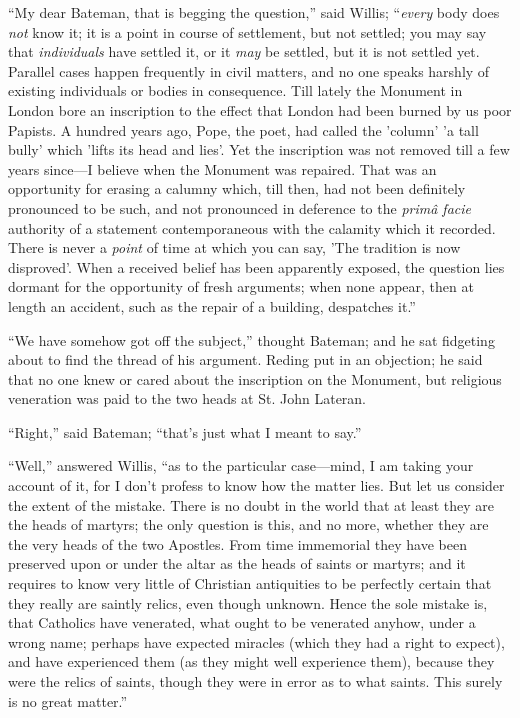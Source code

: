 ``My dear Bateman, that is begging the question,'' said
Willis; ``\emph{every} body does \emph{not} know it; it is a point
in course of settlement, but not settled; you may say that \emph{individuals}
have settled it, or it \emph{may} be settled, but it is not settled
yet. Parallel cases happen frequently in civil matters, and no one
speaks harshly of existing individuals or bodies in consequence.
Till lately the Monument in London bore an inscription to the effect
that London had been burned by us poor Papists. A hundred years ago,
Pope, the poet, had called the 'column' 'a tall bully' which 'lifts
its head and lies'. Yet the inscription was not removed till a few
years since—I believe when the Monument was repaired. That was an
opportunity for erasing a calumny which, till then, had not been
definitely pronounced to be such, and not pronounced in deference to
the \emph{primâ facie} authority of a statement contemporaneous with
the calamity which it recorded. There is never a \emph{point} of time
at which you can say, 'The tradition is now disproved'. When a
received belief has been apparently exposed, the question lies dormant
for the opportunity of fresh arguments; when none appear, then at
length an accident, such as the repair of a building, despatches
it.''

``We have somehow got off the subject,'' thought Bateman;
and he sat fidgeting about to find the thread of his argument. Reding
put in an objection; he said that no one knew or cared about the
inscription on the Monument, but religious veneration was paid to the
two heads at St. John Lateran.

``Right,'' said Bateman; ``that's just what I meant to
say.''

``Well,'' answered Willis, ``as to the particular case—mind,
I am taking your account of it, for I don't profess to know how the
matter lies. But let us consider the extent of the mistake. There is
no doubt in the world that at least they are the heads of martyrs;
the only question is this, and no more, whether they are the
very heads of the two Apostles. From time immemorial they have been
preserved upon or under the altar as the heads of saints or martyrs;
and it requires to know very little of Christian antiquities to be
perfectly certain that they really are saintly relics, even though
unknown. Hence the sole mistake is, that Catholics have venerated,
what ought to be venerated anyhow, under a wrong name; perhaps have
expected miracles (which they had a right to expect), and have
experienced them (as they might well experience them), because they
were the relics of saints, though they were in error as to what
saints. This surely is no great matter.''


